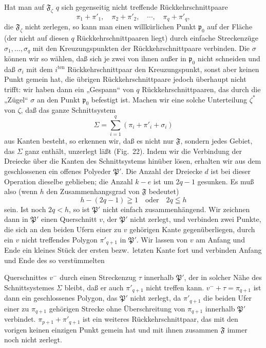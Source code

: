\documentclass{article}
\begin{document}
Hat man auf $\mathfrak{F}_\zeta$ $q$ sich gegenseitig nicht treffende Rückkehrschnittpaare
\[ \pi_1 + \pi'_1, \quad \pi_2 + \pi'_2, \quad \cdots, \quad \pi_q + \pi'_q, \]
die $\mathfrak{F}_\zeta$ nicht zerlegen, so kann man einen willkürlichen Punkt $\mathfrak{p}_0$ auf der Fläche (der nicht auf diesen $q$ Rückkehrschnittpaaren liegt) durch einfache Streckenzüge $\sigma_1, \dots, \sigma_q$ mit den Kreuzungspunkten der Rückkehrschnittpaare verbinden. Die $\sigma$ können wir so wählen, daß sich je zwei von ihnen außer in $\mathfrak{p}_0$ nicht schneiden und daß $\sigma_i$ mit dem $i^{\text{ten}}$ Rückkehrschnittpaar den Kreuzungspunkt, sonst aber keinen Punkt gemein hat, die übrigen Rückkehrschnittpaare jedoch überhaupt nicht trifft: wir haben dann ein „Gespann“ von $q$ Rückkehrschnittpaaren, das durch die „Zügel“ $\sigma$ an den Punkt $\mathfrak{p}_0$ befestigt ist. Machen wir eine solche Unterteilung $\zeta^*$ von $\zeta$, daß das ganze Schnittsystem
\[ \Sigma = \sum_{i=1}^q (\pi_i + \pi'_i + \sigma_i) \]
aus Kanten besteht, so erkennen wir, daß es nicht nur $\mathfrak{F}$, sondern jedes Gebiet, das $\Sigma$ ganz enthält, unzerlegt läßt (Fig.~22). Indem wir die Verbindung der Dreiecke über die Kanten des Schnittsystems hinüber lösen, erhalten wir aus dem geschlossenen ein offenes Polyeder $\mathfrak{P}'$. Die Anzahl der Dreiecke $d$ ist bei dieser Operation dieselbe geblieben; die Anzahl $k - e$ ist um $2q - 1$ gesunken. Es muß also (wenn $h$ den Zusammenhangsgrad von $\mathfrak{F}$ bedeutet)
\[ h - (2q - 1) \geqq 1 \quad \text{oder} \quad 2q \leqq h \]
sein. Ist noch $2q < h$, so ist $\mathfrak{P}'$ nicht einfach zusammenhängend. Wir zeichnen dann in $\mathfrak{P}'$ einen Querschnitt $v$, der $\mathfrak{P}'$ nicht zerlegt, und verbinden zwei Punkte, die sich an den beiden Ufern einer zu $v$ gehörigen Kante gegenüberliegen, durch ein $v$ nicht treffendes Polygon $\pi'_{q+1}$ in $\mathfrak{P}'$. Wir lassen von $v$ am Anfang und Ende ein kleines Stück der ersten bezw.\ letzten Kante fort und verbinden Anfang und Ende des so verstümmelten

Querschnittes $v^-$ durch einen Streckenzug $\tau$ innerhalb $\mathfrak{P}'$, der in solcher Nähe des Schnittsystemes $\Sigma$ bleibt, daß er auch $\pi'_{q+1}$ nicht treffen kann. $v^- + \tau = \pi_{q+1}$ ist dann ein geschlossenes Polygon, das $\mathfrak{P}'$ nicht zerlegt, da $\pi'_{q+1}$ die beiden Ufer einer zu $\pi_{q+1}$ gehörigen Strecke ohne Überschreitung von $\pi_{q+1}$ innerhalb $\mathfrak{P}'$ verbindet. $\pi_{p+1} + \pi'_{q+1}$ ist ein weiteres Rückkehrschnittpaar, das mit den vorigen keinen einzigen Punkt gemein hat und mit ihnen zusammen $\mathfrak{F}$ immer noch nicht zerlegt.
\end{document}
